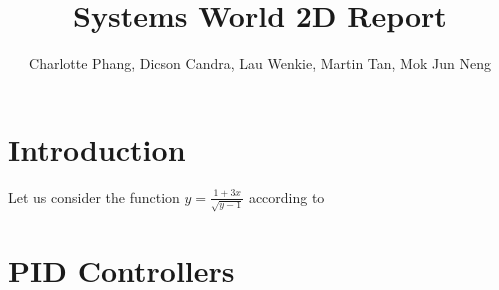 \documentclass[10pt,a4paper]{article}
\author{Charlotte Phang, Dicson Candra, Lau Wenkie, Martin Tan, Mok Jun Neng}
\title{Systems World 2D Report}
\begin{document}
	
	\maketitle
	
	\section{Introduction}
	Let us consider the function $y = \frac{1+3x}{\sqrt{y-1}}$ according to 
	
	\section{PID Controllers}
	
	
	
\end{document}
